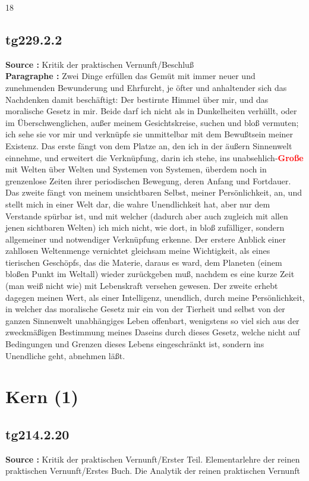 \documentclass[a4paper,12pt,twoside]{book}
\newcommand{\match}[1]{\textcolor{red}{\textbf{#1}}}
\newcommand{\unnumberedsection}[1]{
	\section*{#1}
	\addcontentsline{toc}{section}{#1}
	\markright{#1}
}
\begin{document}
	
	18
	
	
	
	\subsection*{tg229.2.2} 
	\textbf{Source : }Kritik der praktischen Vernunft/Beschluß\\  
	
	\noindent\textbf{Paragraphe : }Zwei Dinge erfüllen das Gemüt mit immer neuer und zunehmenden Bewunderung und Ehrfurcht, je öfter und anhaltender sich das Nachdenken damit beschäftigt: Der bestirnte Himmel über mir, und das moralische Gesetz in mir. Beide darf ich nicht als in Dunkelheiten verhüllt, oder im Überschwenglichen, außer meinem Gesichtskreise, suchen und bloß vermuten; ich sehe sie vor mir und verknüpfe sie unmittelbar mit dem Bewußtsein meiner Existenz. Das erste fängt von dem Platze an, den ich in der äußern Sinnenwelt einnehme, und erweitert die Verknüpfung, darin ich stehe, ins unabsehlich-\match{Große} mit Welten über Welten und Systemen von Systemen, überdem noch in grenzenlose Zeiten ihrer periodischen Bewegung, deren Anfang und Fortdauer. Das zweite fängt von meinem unsichtbaren Selbst, meiner Persönlichkeit, an, und stellt mich in einer Welt dar, die wahre Unendlichkeit hat, aber nur dem Verstande spürbar ist, und mit welcher (dadurch aber auch zugleich mit allen jenen sichtbaren Welten) ich mich nicht, wie dort, in bloß zufälliger, sondern allgemeiner und notwendiger Verknüpfung erkenne. Der erstere Anblick einer zahllosen Weltenmenge vernichtet gleichsam meine Wichtigkeit, als eines tierischen Geschöpfs, das die Materie, daraus es ward, dem Planeten (einem bloßen Punkt im Weltall) wieder zurückgeben muß, nachdem es eine kurze Zeit (man weiß nicht wie) mit Lebenskraft versehen gewesen. Der zweite erhebt dagegen meinen Wert, als einer Intelligenz, unendlich, durch meine Persönlichkeit, in welcher das moralische Gesetz mir ein von der Tierheit und selbst von der ganzen Sinnenwelt unabhängiges Leben offenbart, wenigstens so viel sich aus der zweckmäßigen Bestimmung meines Daseins durch dieses Gesetz, welche nicht auf Bedingungen und Grenzen dieses Lebens eingeschränkt ist, sondern ins Unendliche geht, abnehmen läßt. 
	
	\unnumberedsection{Kern (1)} 
	\subsection*{tg214.2.20} 
	\textbf{Source : }Kritik der praktischen Vernunft/Erster Teil. Elementarlehre der reinen praktischen Vernunft/Erstes Buch. Die Analytik der reinen praktischen Vernunft\\  
	
\end{document}
